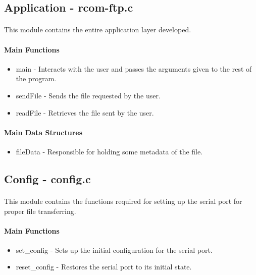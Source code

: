 \documentclass[11pt]{article}
\begin{document}
\subsection{Application - rcom-ftp.c}

\paragraph{}This module contains the entire application layer developed.

\paragraph{Main Functions}

\begin{itemize}
        \item{main - Interacts with the user and passes the arguments given to the rest of the program.}
        \item{sendFile - Sends the file requested by the user.}
        \item{readFile - Retrieves the file sent by the user.}
\end{itemize}

\paragraph{Main Data Structures}

\begin{itemize}
        \item{fileData - Responsible for holding some metadata of the file.}
\end{itemize}

\subsection{Config - config.c}

\paragraph{}This module contains the functions required for setting up the serial port for proper file
transferring.

\paragraph{Main Functions}

\begin{itemize}
        \item{set\_config - Sets up the initial configuration for the serial port.}
        \item{reset\_config - Restores the serial port to its initial state.}
\end{itemize}
\end{document}
